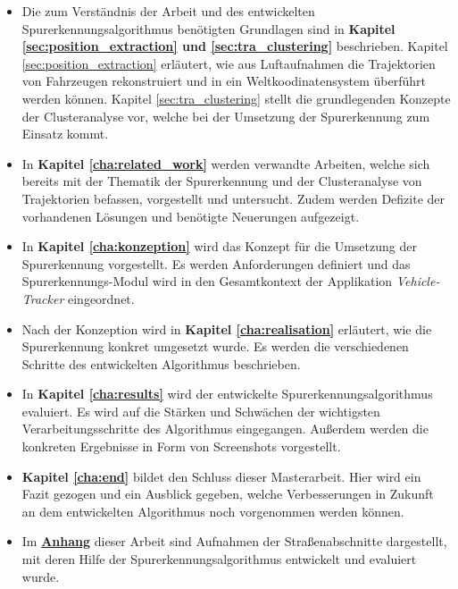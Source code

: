 \begin{itemize}
    \item Die zum Verständnis der Arbeit und des entwickelten Spurerkennungsalgorithmus benötigten
            Grundlagen sind in \textbf{Kapitel \ref{sec:position_extraction} und \ref{sec:tra_clustering}} beschrieben.
            Kapitel \ref{sec:position_extraction} erläutert, wie aus Luftaufnahmen die Trajektorien von Fahrzeugen
            rekonstruiert und in ein Weltkoodinatensystem überführt werden können.
            Kapitel \ref{sec:tra_clustering} stellt die grundlegenden Konzepte der Clusteranalyse vor, welche
            bei der Umsetzung der Spurerkennung zum Einsatz kommt.
    \item In \textbf{Kapitel \ref{cha:related_work}} werden verwandte Arbeiten, welche sich bereits mit
            der Thematik der Spurerkennung und der Clusteranalyse von Trajektorien befassen, vorgestellt und untersucht.
            Zudem werden Defizite der vorhandenen Lösungen und benötigte Neuerungen aufgezeigt.
    \item In \textbf{Kapitel \ref{cha:konzeption}} wird das Konzept für die Umsetzung der Spurerkennung vorgestellt.
            Es werden Anforderungen definiert und das Spurerkennungs-Modul wird in den Gesamtkontext
            der Applikation \textit{Vehicle-Tracker} eingeordnet.
    \item Nach der Konzeption wird in \textbf{Kapitel \ref{cha:realisation}} erläutert, wie die Spurerkennung konkret
            umgesetzt wurde. Es werden die verschiedenen Schritte des entwickelten Algorithmus beschrieben.
    \item In \textbf{Kapitel \ref{cha:results}} wird der entwickelte Spurerkennungsalgorithmus evaluiert.
            Es wird auf die Stärken und Schwächen der wichtigsten Verarbeitungsschritte des Algorithmus eingegangen.
            Außerdem werden die konkreten Ergebnisse in Form von Screenshots vorgestellt.
    \item \textbf{Kapitel \ref{cha:end}} bildet den Schluss dieser Masterarbeit. Hier wird
            ein Fazit gezogen und ein Ausblick gegeben, welche Verbesserungen in Zukunft an dem entwickelten
            Algorithmus noch vorgenommen werden können.
    \item Im \textbf{\hyperref[cha:anhang_a]{Anhang}} dieser Arbeit sind Aufnahmen der Straßenabschnitte dargestellt,
            mit deren Hilfe der Spurerkennungsalgorithmus entwickelt und evaluiert wurde.
\end{itemize}

